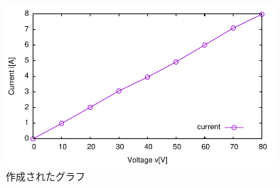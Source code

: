 \begin{figure}[tbp]%
 \centering%
 \includegraphics[width=10cm]{graph1.pdf}%
 \caption{作成されたグラフ}%
 \label{fig:graph1}%
\end{figure}%
